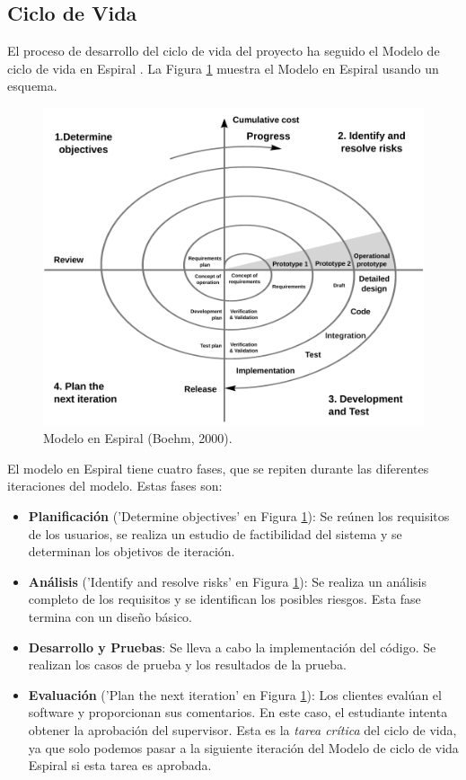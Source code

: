 \subsection{Ciclo de Vida}

El proceso de desarrollo del ciclo de vida del proyecto ha seguido el Modelo de ciclo de vida en Espiral \cite{boehm1988}. La Figura \ref{fig:spiral_model} muestra el Modelo en Espiral usando un esquema.

\begin{figure}[htbp]
 	\centering
 	\includegraphics[width=12cm]{figures/spiral_model}
 	\caption{Modelo en Espiral (Boehm, 2000).}
	\label{fig:spiral_model}
\end{figure}

El modelo en Espiral tiene cuatro fases, que se repiten durante las diferentes iteraciones del modelo. Estas fases son:

\begin{itemize}
\item \textbf{Planificación} ('Determine objectives' en Figura \ref{fig:spiral_model}): Se reúnen los requisitos de los usuarios, se realiza un estudio de factibilidad del sistema y se determinan los objetivos de iteración.

\item \textbf{Análisis} ('Identify and resolve risks' en Figura \ref{fig:spiral_model}): Se realiza un análisis completo de los requisitos y se identifican los posibles riesgos. Esta fase termina con un diseño básico.

\item \textbf{Desarrollo y Pruebas}: Se lleva a cabo la implementación del código. Se realizan los casos de prueba y los resultados de la prueba.

\item \textbf{Evaluación} ('Plan the next iteration' en Figura \ref{fig:spiral_model}): 
Los clientes evalúan el software y proporcionan sus comentarios. En este caso, el estudiante intenta obtener la aprobación del supervisor. Esta es la \textit{tarea crítica} del ciclo de vida, ya que solo podemos pasar a la siguiente iteración del Modelo de ciclo de vida Espiral si esta tarea es aprobada.

\end{itemize}

